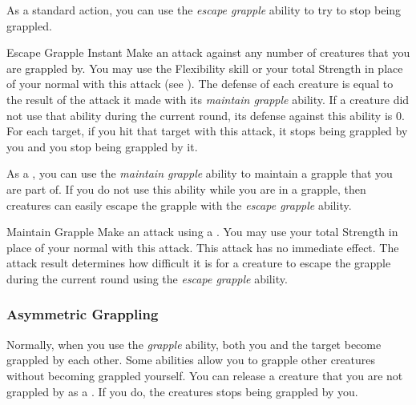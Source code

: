              As a standard action, you can use the \textit{escape grapple} ability to try to stop being grappled.

            \begin{instantability}{Escape Grapple}
                \label{Escape Grapple}
                Instant
                \rankline
                Make an attack against any number of creatures that you are grappled by.
                You may use the Flexibility skill or your total Strength in place of your normal  with this attack (see ).
                The defense of each creature is equal to the result of the attack it made with its \textit{maintain grapple} ability.
                If a creature did not use that ability during the current round, its defense against this ability is 0.
                For each target, if you hit that target with this attack, it stops being grappled by you and you stop being grappled by it.
            \end{instantability}

             As a , you can use the \textit{maintain grapple} ability to maintain a grapple that you are part of.
            If you do not use this ability while you are in a grapple, then creatures can easily escape the grapple with the \textit{escape grapple} ability.
            \begin{instantability}{Maintain Grapple}
                \rankline
                Make an attack using a .
                You may use your total Strength in place of your normal  with this attack.
                This attack has no immediate effect.
                The attack result determines how difficult it is for a creature to escape the grapple during the current round using the \textit{escape grapple} ability.
            \end{instantability}

        \subsubsection{Asymmetric Grappling}\label{Asymmetric Grappling}
            Normally, when you use the \textit{grapple} ability, both you and the target become grappled by each other.
            Some abilities allow you to grapple other creatures without becoming grappled yourself.
            You can release a creature that you are not grappled by as a .
            If you do, the creatures stops being grappled by you.

